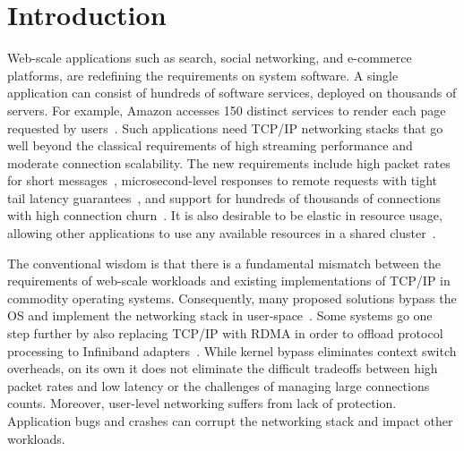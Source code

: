 
\section{Introduction}
\label{sec:intro}


Web-scale applications such as search, social networking, and
e-commerce platforms, are redefining the requirements on system
software. A single application can consist of hundreds of software
services, deployed on thousands of servers. For example, Amazon
accesses 150 distinct services to render each page requested by
users~\cite{DBLP:conf/sosp/DeCandiaHJKLPSVV07}. Such applications need
TCP/IP networking stacks that go well beyond the classical
requirements of high streaming performance and moderate connection
scalability. The new requirements include high packet rates for short
messages~\cite{Atikoglu:2012:WAL}, microsecond-level responses to
remote requests with tight tail latency
guarantees~\cite{DBLP:journals/cacm/DeanB13}, and support for hundreds
of thousands of connections with high connection
churn~\cite{DBLP:conf/nsdi/NishtalaFGKLLMPPSSTV13}. It is also desirable to be elastic
in resource usage, allowing other applications to use any available
resources in a shared
cluster~\cite{DBLP:journals/computer/BarrosoH07,DBLP:conf/eurosys/LeverichK14}.

The conventional wisdom is that there is a fundamental mismatch
between the requirements of web-scale workloads and existing
implementations of TCP/IP in commodity operating
systems. Consequently, many proposed solutions bypass the OS and
implement the networking stack in
user-space~\cite{jeong2014mtcp,DBLP:conf/cloud/KapoorPTVV12,openonload,DBLP:conf/sigcomm/MarinosWH14,DBLP:conf/sigcomm/ThekkathNML93}. Some
systems go one step further by also replacing TCP/IP with RDMA in
order to offload protocol processing to Infiniband
adapters~\cite{DBLP:conf/sosp/OngaroRSOR11,DBLP:conf/icpp/JoseSLZHWIOWSP11,mitchell:rdma,dragojevic14farm}. While
kernel bypass eliminates context switch overheads, on its own it does
not eliminate the difficult tradeoffs between high packet rates and
low latency or the challenges of managing large connections
counts. Moreover, user-level networking suffers from lack of
protection. Application bugs and crashes can corrupt the networking
stack and impact other workloads.



